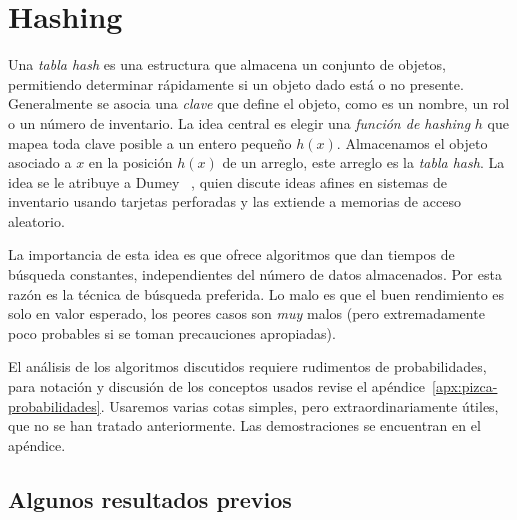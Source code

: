 

\chapter{Hashing}
\label{cha:hashing}

  Una \emph{tabla \foreignlanguage{english}{hash}}
  es una estructura que almacena un conjunto de objetos,
  permitiendo determinar rápidamente si un objeto dado está o no presente.
  Generalmente se asocia una \emph{clave} que define el objeto,
  como es un nombre,
  un rol o un número de inventario.
  La idea central
  es elegir una \emph{función de hashing} \(h\) que mapea toda clave posible
  a un entero pequeño \(h(x)\).
  Almacenamos el objeto asociado a \(x\) en la posición \(h(x)\) de un arreglo,
  este arreglo es la \emph{tabla \foreignlanguage{english}{hash}}.
  La idea se le atribuye a Dumey~%
    \cite{dumey56:_indexing_rapid_random_access_memory_systems},
  quien discute ideas afines
  en sistemas de inventario usando tarjetas perforadas
  y las extiende a memorias de acceso aleatorio.

  La importancia de esta idea
  es que ofrece algoritmos que dan tiempos de búsqueda
  constantes,
  independientes del número de datos almacenados.
  Por esta razón es la técnica de búsqueda preferida.
  Lo malo es que el buen rendimiento es solo en valor esperado,
  los peores casos son \emph{muy} malos
  (pero extremadamente poco probables si se toman precauciones apropiadas).

  El análisis de los algoritmos discutidos
  requiere rudimentos de probabilidades,
  para notación y discusión de los conceptos usados
  revise el apéndice~\ref{apx:pizca-probabilidades}.
  Usaremos varias cotas simples,
  pero extraordinariamente útiles,
  que no se han tratado anteriormente.
  Las demostraciones se encuentran en el apéndice.

\section{Algunos resultados previos}
\label{sec:resultados-previos}

